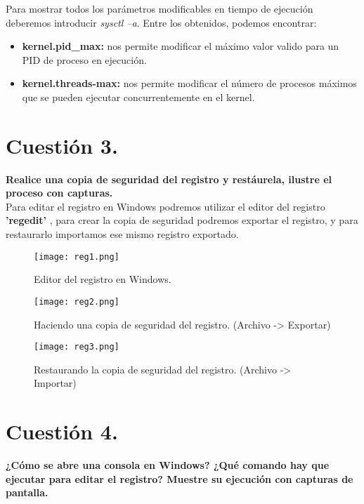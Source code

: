 \documentclass[a4paper, 10pt]{article} %
\begin{document}
Para mostrar todos los parámetros modificables en tiempo de ejecución deberemos introducir \textit{sysctl –a}. Entre los obtenidos, podemos encontrar\cite{2}:

\begin{itemize}
    \item \textbf{kernel.pid\_max:} nos permite modificar el máximo valor valido para un PID de proceso en ejecución.
    \item \textbf{kernel.threads-max:} nos permite modificar el número de procesos máximos que se pueden ejecutar concurrentemente en el kernel.
\end{itemize}

\section{Cuestión 3.}
\textbf{Realice una copia de seguridad del registro y restáurela, ilustre el proceso con capturas.}\\

Para editar el registro en Windows podremos utilizar el editor del registro \textbf{'regedit'} \cite{3}, para crear la copia de seguridad podremos exportar el registro, y para restaurarlo importamos ese mismo registro exportado.

\begin{figure}[H]
\centering 
\texttt{[image: reg1.png]} 
\caption{Editor del registro en Windows.} 
\label{contexto:figura} 
\end{figure}

\begin{figure}[H]
\centering 
\texttt{[image: reg2.png]} 
\caption{Haciendo una copia de seguridad del registro. (Archivo -> Exportar)} 
\label{contexto:figura} 
\end{figure}


\begin{figure}[H]
\centering 
\texttt{[image: reg3.png]} 
\caption{Restaurando la copia de seguridad del registro. (Archivo -> Importar)} 
\label{contexto:figura} 
\end{figure}

\pagebreak

\section{Cuestión 4.}
\textbf{¿Cómo se abre una consola en Windows? ¿Qué comando hay que ejecutar para editar el registro? Muestre su ejecución con capturas de pantalla.}\\
\end{document}
